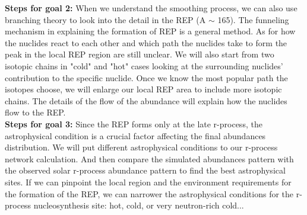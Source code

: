 \documentclass[aps,prl,preprint,groupedaddress]{revtex4}
\begin{document}
\textbf{Steps for goal 2:} 
When we understand the smoothing process, we can also use branching theory to look into the detail in the REP (A $\sim$ 165). The funneling mechanism in explaining the formation of REP is a general method. As for how the nuclides react to each other and which path the nuclides take to form the peak in the local REP region are still unclear. We will also start from two isotopic chains in "cold" and "hot" cases looking at the surrounding nuclides' contribution to the specific nuclide. Once we know the most popular path the isotopes choose, we will enlarge our local REP area to include more isotopic chains. The details of the flow of the abundance will explain how the nuclides flow to the REP.\\

\textbf{Steps for goal 3:} 
Since the REP forms only at the late r-process, the astrophysical condition is a crucial factor affecting the final abundances distribution. We will put different astrophysical conditions to our r-process network calculation. And then compare the simulated abundances pattern with the observed solar r-process abundance pattern to find the best astrophysical sites. If we can pinpoint the local region and the environment requirements for the formation of the REP, we can narrower the astrophysical conditions for the r-process nucleosynthesis site: hot, cold, or very neutron-rich cold...\\
\clearpage


\end{document}
